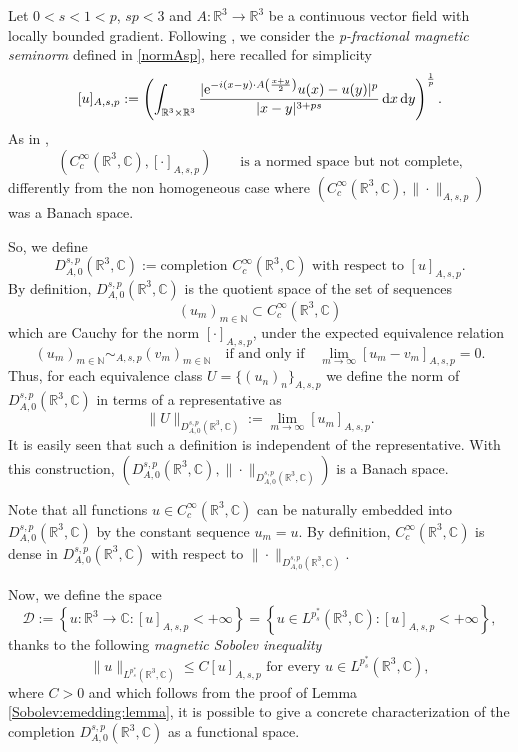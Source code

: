 \documentclass[leqno,11pt]{amsart}
\newcommand{\R}{\mathbb R}
\newcommand{\CC}{\mathbb C}
\newcommand{\C}{\mathbb C}
\newcommand{\cD}{{\mathcal D}}
\numberwithin{equation}{section}
\def\e{{\rm e}}
\newcommand{\expAminus}{\e^{-i(x-y)\cdot A\left(\frac{x+y}{2}\right)}}
\begin{document}
Let $0<s<1<p$, $sp<3$ and $A:\R^3 \to \R^3$ be a continuous vector field with locally bounded gradient.
Following \cite{NguyenPinamontiSquassinaVecchi_2018}, we consider the \textit{p-fractional magnetic seminorm} defined in \eqref{normAsp}, here recalled for simplicity
\begin{equation}\label{normAsp:D}
    [u]_{A,s,p}:=\left(\int_{\R^3\times \R^3}\frac{|\expAminus u(x) - u(y)|^p}{|x-y|^{3+ps}} \dd x \dd y \right)^{\frac1p}.
\end{equation}
As in \cite{BrascoGV}, 
$$
    (C^\infty_c(\R^3,\CC), [\cdot]_{A,s,p})\qquad \text{is a normed space but not complete,}
$$
differently from the non homogeneous case where 
$(C^\infty_c(\R^3,\CC), \|\cdot\|_{A,s,p})$ was a Banach space.

So, we define
$$D^{s,p}_{A,0}(\R^3,\CC):=\text{completion $C_c^\infty(\R^3,\CC)$ with respect to $[u]_{A,s,p}$}.$$
By definition, $D^{s,p}_{A,0}(\R^3,\CC)$ is the quotient space of the set of sequences
\[
(u_m)_{m \in \mathbb{N}} \subset C_c^\infty(\mathbb{R}^3, \CC)
\]
which are Cauchy for the norm $[\cdot]_{A,s,p}$, under the expected equivalence relation
\[
(u_m)_{m \in \mathbb{N}} \sim_{A,s,p} (v_m)_{m \in \mathbb{N}}
\quad \text{if and only if} \quad
\lim_{m \to \infty} [u_m - v_m]_{A,s,p} = 0.
\]
Thus, for each equivalence class $U=\{(u_n)_n\}_{A,s,p}$ we define the norm of $D^{s,p}_{A,0}(\R^3,\CC)$ in terms of a
representative as
    \begin{equation}
    \label{defnormabrutta}
        \|U\|_{D^{s,p}_{A,0}(\R^3,\CC)}:=\lim_{m\to\infty}[u_m]_{A,s,p}.
    \end{equation}
It is easily seen that such a definition is independent of the representative.
With this construction, $(D^{s,p}_{A,0}(\R^3,\CC),\|\cdot\|_{D^{s,p}_{A,0}(\R^3,\CC)})$ is a Banach space.

Note that all functions $u \in C^\infty_c(\R^3,\C)$ can be naturally embedded into
$D^{s,p}_{A,0}(\R^3,\C)$ by the constant sequence $u_m = u$. By definition, $C^\infty_c(\R^3,\CC)$ is
dense in $D^{s,p}_{A,0}(\R^3,\C)$ with respect to $\|\cdot\|_{D^{s,p}_{A,0}(\R^3,\CC)}$.

Now, we define the space
$$
\cD :=\left\{u :\R^3 \to \C : [u]_{A,s,p} < +\infty\right\} = \left\{u \in L^{p^*_s}(\R^3,\C) : [u]_{A,s,p} < +\infty\right\},
$$
thanks to the following \textit{magnetic Sobolev inequality}
\begin{equation}
    \label{magnetic:Sobovel:inequality}
    \|u\|_{L^{p^*_s}(\R^3,\C)} \leq C[u]_{A,s,p} \text{ for every } u \in L^{p^*_s}(\R^3,\C),
\end{equation}
where $C>0$ and which follows from the proof of Lemma \ref{Sobolev:emedding:lemma}, it is possible to give a concrete characterization of the completion
$D_{A,0}^{s,p}(\R^3,\CC)$ as a functional space.\\
\end{document}

